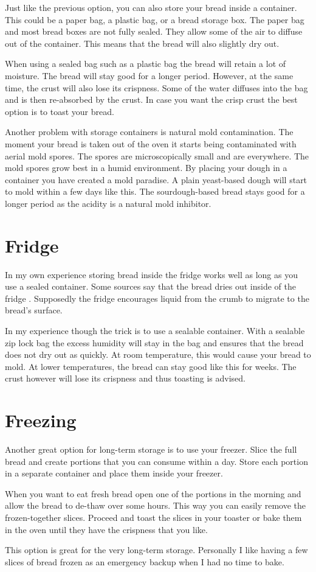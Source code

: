 Just like the previous option, you can also store your
bread inside a container. This could be a paper bag, 
a plastic bag, or a bread storage box. The paper bag and
most bread boxes are not fully sealed. They allow some of
the air to diffuse out of the container. This means that
the bread will also slightly dry out.

When using a sealed bag such as a plastic bag the bread
will retain a lot of moisture. The bread will stay good
for a longer period. However, at the same time, the crust
will also lose its crispness. Some of the water diffuses
into the bag and is then re-absorbed by the crust. In case
you want the crisp crust the best option is to toast your
bread.

Another problem with storage containers is natural
mold contamination. The moment your bread is taken out of
the oven it starts being contaminated with aerial mold spores.
The spores are microscopically small and are everywhere.
The mold spores grow best in a humid environment. By placing
your dough in a container you have created a mold paradise.
A plain yeast-based dough will start to mold within a few days
like this. The sourdough-based bread stays good
for a longer period as the acidity is a natural mold
inhibitor.

\section{Fridge}

In my own experience storing bread inside the fridge
works well as long as you use a sealed container. Some
sources say that the bread dries out inside of the
fridge \cite{storing+bread}. Supposedly the fridge
encourages liquid from the crumb to migrate to the bread's surface.

In my experience though the trick is to use a sealable
container. With a sealable zip lock bag
the excess humidity will stay in the bag and ensures
that the bread does not dry out as quickly. At room
temperature, this would cause your bread to mold. At
lower temperatures, the bread can stay good like this for
weeks. The crust however will lose its crispness and
thus toasting is advised.

\section{Freezing}

Another great option for long-term storage is to use
your freezer. Slice the full bread and create portions
that you can consume within a day. Store each portion
in a separate container and place them inside your
freezer.

When you want to eat fresh bread open one of the portions
in the morning and allow the bread to de-thaw over some
hours. This way you can easily remove the frozen-together
slices. Proceed and toast the slices in your toaster
or bake them in the oven until they have the crispness
that you like.

This option is great for the very long-term storage. Personally
I like having a few slices of bread frozen as an emergency
backup when I had no time to bake.
